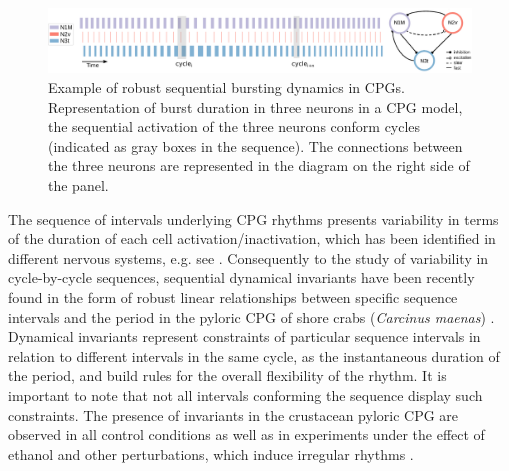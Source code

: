 \begin{figure}[htb!]
	\includegraphics[width=\textwidth]{img/invariants/variability/sequences_in_cpgs.png}
	\caption{Example of robust sequential bursting dynamics in CPGs. Representation of burst duration in three neurons in a CPG model, the sequential activation of the three neurons conform cycles (indicated as gray boxes in the sequence). The connections between the three neurons are represented in the diagram on the right side of the panel.}
	\label{fig:sequences_in_cpgs}
\end{figure}

The sequence of intervals underlying CPG rhythms presents variability in terms of the duration of each cell activation/inactivation, which has been identified in different nervous systems, e.g. see \cite{reyes_artificial_2008,elliott_temporal_1991,martinez_shortterm_2019}. Consequently to the study of variability in cycle-by-cycle sequences, sequential dynamical invariants have been recently found in the form of robust linear relationships between specific sequence intervals and the period in the pyloric CPG of shore crabs (\textit{Carcinus maenas}) \parencite{elices_robust_2019}. Dynamical invariants represent constraints of particular sequence intervals in relation to different intervals in the same cycle, as the instantaneous duration of the period, and build rules for the overall flexibility of the rhythm. It is important to note that not all intervals conforming the sequence display such constraints. The presence of invariants in the crustacean pyloric CPG are observed in all control conditions as well as in experiments under the effect of ethanol and other perturbations, which induce irregular rhythms \parencite{elices_robust_2019}. 



